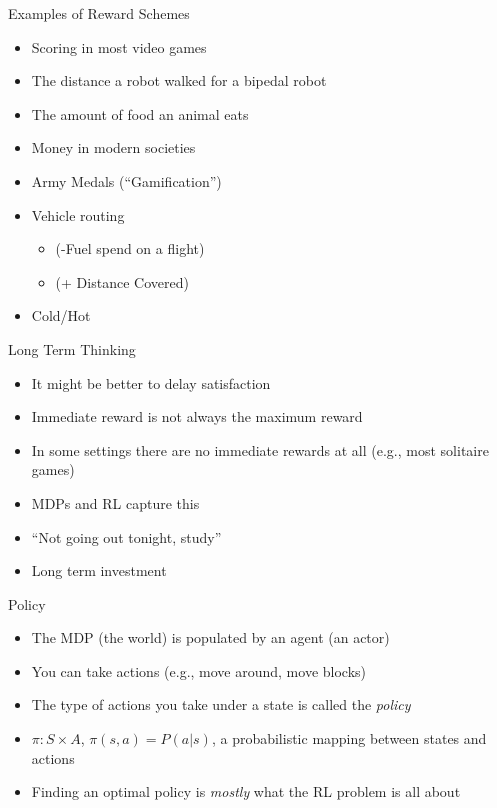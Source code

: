 \documentclass[]{beamer}
\providecommand{\tightlist}{%
  \setlength{\itemsep}{0pt}\setlength{\parskip}{0pt}}
\begin{document}
\begin{frame}{Examples of Reward Schemes}

\begin{itemize}
\tightlist
\item
  Scoring in most video games
\item
  The distance a robot walked for a bipedal robot
\item
  The amount of food an animal eats
\item
  Money in modern societies
\item
  Army Medals (``Gamification'')
\item
  Vehicle routing

  \begin{itemize}
  \tightlist
  \item
    (-Fuel spend on a flight)
  \item
    (+ Distance Covered)
  \end{itemize}
\item
  Cold/Hot
\end{itemize}

\end{frame}

\begin{frame}{Long Term Thinking}

\begin{itemize}
\tightlist
\item
  It might be better to delay satisfaction
\item
  Immediate reward is not always the maximum reward
\item
  In some settings there are no immediate rewards at all (e.g., most
  solitaire games)
\item
  MDPs and RL capture this
\item
  ``Not going out tonight, study''
\item
  Long term investment
\end{itemize}

\end{frame}

\begin{frame}{Policy}

\begin{itemize}
\tightlist
\item
  The MDP (the world) is populated by an agent (an actor)
\item
  You can take actions (e.g., move around, move blocks)
\item
  The type of actions you take under a state is called the \emph{policy}
\item
  \(\pi: S \times A\), \(\pi(s,a) = P(a|s)\), a probabilistic mapping
  between states and actions
\item
  Finding an optimal policy is \emph{mostly} what the RL problem is all
  about
\end{itemize}

\end{frame}
\end{document}
